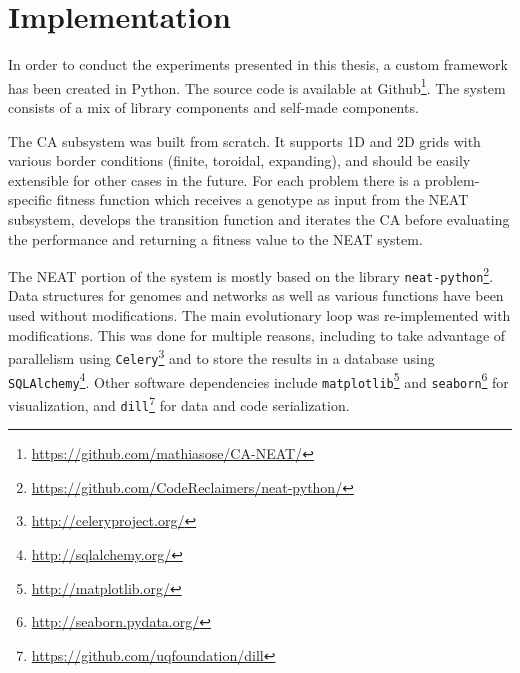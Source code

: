 \chapter{Implementation}
\label{sec:implementation}

In order to conduct the experiments presented in this thesis,
a custom framework has been created in Python.
The source code is available at Github\footnote{\url{https://github.com/mathiasose/CA-NEAT/}}.
The system consists of a mix of library components and self-made components.

The CA subsystem was built from scratch.
It supports 1D and 2D grids with various border conditions (finite, toroidal, expanding), and should be easily extensible for other cases in the future.
For each problem there is a problem-specific fitness function which receives a genotype as input from the NEAT subsystem,
develops the transition function and iterates the CA  before evaluating the performance and returning a fitness value to the NEAT system.

The NEAT portion of the system is mostly based on the library \texttt{neat-python}\footnote{\url{https://github.com/CodeReclaimers/neat-python/}}.
Data structures for genomes and networks as well as various functions have been used without modifications.
The main evolutionary loop was re-implemented with modifications.
This was done for multiple reasons, including to take advantage of parallelism using \texttt{Celery}\footnote{\url{http://celeryproject.org/}} and to store the results in a database using \texttt{SQLAlchemy}\footnote{\url{http://sqlalchemy.org/}}.
Other software dependencies include \texttt{matplotlib}\footnote{\url{http://matplotlib.org/}} and \texttt{seaborn}\footnote{\url{http://seaborn.pydata.org/}} for visualization, and \texttt{dill}\footnote{\url{https://github.com/uqfoundation/dill}} for data and code serialization.

